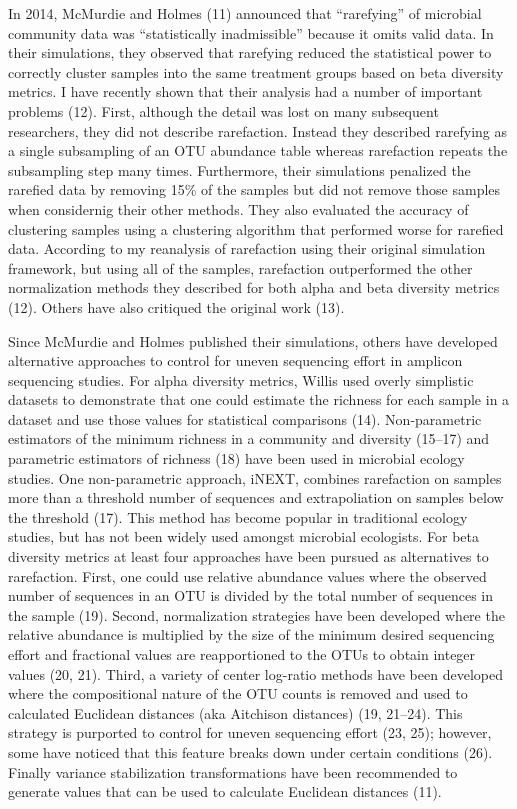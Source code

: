 \documentclass[
]{article}
\begin{document}
In 2014, McMurdie and Holmes (11) announced that ``rarefying'' of
microbial community data was ``statistically inadmissible'' because it
omits valid data. In their simulations, they observed that rarefying
reduced the statistical power to correctly cluster samples into the same
treatment groups based on beta diversity metrics. I have recently shown
that their analysis had a number of important problems (12). First,
although the detail was lost on many subsequent researchers, they did
not describe rarefaction. Instead they described rarefying as a single
subsampling of an OTU abundance table whereas rarefaction repeats the
subsampling step many times. Furthermore, their simulations penalized
the rarefied data by removing 15\% of the samples but did not remove
those samples when considernig their other methods. They also evaluated
the accuracy of clustering samples using a clustering algorithm that
performed worse for rarefied data. According to my reanalysis of
rarefaction using their original simulation framework, but using all of
the samples, rarefaction outperformed the other normalization methods
they described for both alpha and beta diversity metrics (12). Others
have also critiqued the original work (13).

Since McMurdie and Holmes published their simulations, others have
developed alternative approaches to control for uneven sequencing effort
in amplicon sequencing studies. For alpha diversity metrics, Willis used
overly simplistic datasets to demonstrate that one could estimate the
richness for each sample in a dataset and use those values for
statistical comparisons (14). Non-parametric estimators of the minimum
richness in a community and diversity (15--17) and parametric estimators
of richness (18) have been used in microbial ecology studies. One
non-parametric approach, iNEXT, combines rarefaction on samples more
than a threshold number of sequences and extrapoliation on samples below
the threshold (17). This method has become popular in traditional
ecology studies, but has not been widely used amongst microbial
ecologists. For beta diversity metrics at least four approaches have
been pursued as alternatives to rarefaction. First, one could use
relative abundance values where the observed number of sequences in an
OTU is divided by the total number of sequences in the sample (19).
Second, normalization strategies have been developed where the relative
abundance is multiplied by the size of the minimum desired sequencing
effort and fractional values are reapportioned to the OTUs to obtain
integer values (20, 21). Third, a variety of center log-ratio methods
have been developed where the compositional nature of the OTU counts is
removed and used to calculated Euclidean distances (aka Aitchison
distances) (19, 21--24). This strategy is purported to control for
uneven sequencing effort (23, 25); however, some have noticed that this
feature breaks down under certain conditions (26). Finally variance
stabilization transformations have been recommended to generate values
that can be used to calculate Euclidean distances (11).
\end{document}

